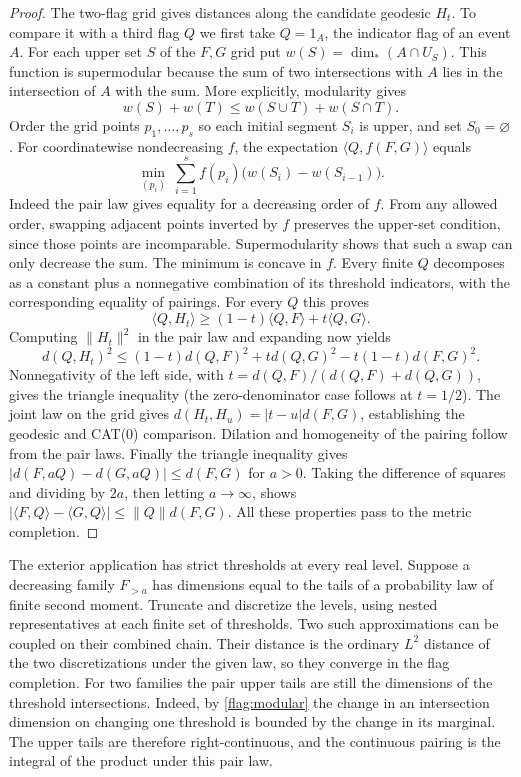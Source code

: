 \begin{proof}
The two-flag grid gives distances along the candidate geodesic
$H_t$. To compare it with a third flag $Q$ we first take
$Q=1_A$, the indicator flag of an event $A$. For each upper set $S$
of the $F,G$ grid put $w(S)=\dim_*(A\cap U_S)$. This function is
supermodular because the sum of two intersections with $A$ lies in
the intersection of $A$ with the sum. More explicitly, modularity
gives
\[
 w(S)+w(T)\le w(S\cup T)+w(S\cap T).
\]
Order the grid points $p_1,\ldots,p_s$ so each initial segment $S_i$
is upper, and set $S_0=\varnothing$. For coordinatewise nondecreasing
$f$, the expectation $\langle Q,f(F,G)\rangle$ equals
\[
 \min_{(p_i)}\ \sum_{i=1}^s f(p_i)\big(w(S_i)-w(S_{i-1})\big).
\]
Indeed the pair law gives equality for a decreasing order of $f$.
From any allowed order, swapping adjacent points inverted by $f$
preserves the upper-set condition, since those points are incomparable.
Supermodularity shows that such a swap can only decrease the sum.
The minimum is concave in $f$. Every finite $Q$ decomposes as a constant
plus a nonnegative combination of its threshold indicators, with the
corresponding equality of pairings. For every $Q$ this proves
\[
 \langle Q,H_t\rangle\ge(1-t)\langle Q,F\rangle+t\langle Q,G\rangle.
\]
Computing $\|H_t\|^2$ in the pair law and expanding now yields
\[
 d(Q,H_t)^2\le (1-t)d(Q,F)^2+t d(Q,G)^2-t(1-t)d(F,G)^2 .
\]
Nonnegativity of the left side, with
$t=d(Q,F)/(d(Q,F)+d(Q,G))$, gives the triangle inequality
(the zero-denominator case follows at $t=1/2$).
The joint law on the grid gives
$d(H_t,H_u)=|t-u|d(F,G)$, establishing the geodesic and CAT(0)
comparison. Dilation and homogeneity of the pairing follow from the
pair laws. Finally the triangle inequality gives
$|d(F,aQ)-d(G,aQ)|\le d(F,G)$ for $a>0$.
Taking the difference of squares and dividing by $2a$, then letting
$a\to\infty$, shows
$|\langle F,Q\rangle-\langle G,Q\rangle|\le\|Q\|d(F,G)$.
All these properties pass to the metric completion.
\end{proof}

The exterior application has strict thresholds at every real level.
Suppose a decreasing family $F_{>a}$ has dimensions equal to the
tails of a probability law of finite second moment. Truncate and
discretize the levels, using nested representatives at each finite
set of thresholds. Two such approximations can be coupled on their
combined chain. Their distance is the ordinary $L^2$ distance of the
two discretizations under the given law, so they converge in the flag
completion. For two families the pair upper tails are still the
dimensions of the threshold intersections. Indeed, by
\eqref{flag:modular} the change in an intersection dimension on
changing one threshold is bounded by the change in its marginal. The
upper tails are therefore right-continuous, and the continuous pairing
is the integral of the product under this pair law.

